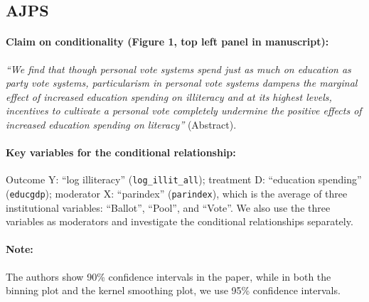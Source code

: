 \documentclass[12pt]{article}
\begin{document}
\subsection{\citet{Hicken2008} AJPS} \label{hicken}


\paragraph{Claim on conditionality (Figure 1, top left panel in manuscript):} \emph{``We find that
  though personal vote systems spend just as much on education as
  party vote systems, particularism in personal vote systems dampens
  the marginal effect of increased education spending on illiteracy
  and at its highest levels, incentives to cultivate a personal vote
  completely undermine the positive effects of increased education
  spending on literacy''} (Abstract).

\paragraph{Key variables for the conditional relationship:} Outcome Y:
``log illiteracy'' (\texttt{log\_illit\_all}); treatment D: ``education spending''
(\texttt{educgdp}); moderator X: ``parindex'' (\texttt{parindex}),
which is the average of three institutional variables: ``Ballot'',
``Pool'', and ``Vote''. We also use the three variables as moderators
and investigate the conditional relationships separately.  

\paragraph{Note:} The authors show 90\% confidence intervals in the paper, while in both the binning plot and the kernel smoothing plot, we use 95\% confidence intervals.
\end{document}
